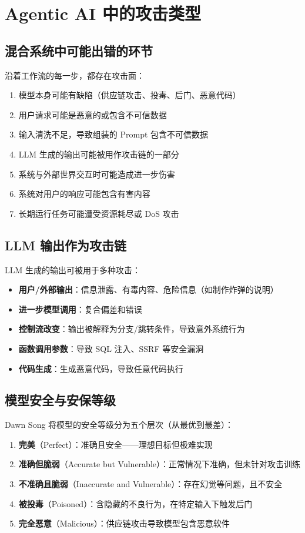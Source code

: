 \section{Agentic AI 中的攻击类型}

\subsection{混合系统中可能出错的环节}

沿着工作流的每一步，都存在攻击面：
\begin{enumerate}
    \item 模型本身可能有缺陷（供应链攻击、投毒、后门、恶意代码）
    \item 用户请求可能是恶意的或包含不可信数据
    \item 输入清洗不足，导致组装的 Prompt 包含不可信数据
    \item LLM 生成的输出可能被用作攻击链的一部分
    \item 系统与外部世界交互时可能造成进一步伤害
    \item 系统对用户的响应可能包含有害内容
    \item 长期运行任务可能遭受资源耗尽或 DoS 攻击
\end{enumerate}

\subsection{LLM 输出作为攻击链}

LLM 生成的输出可被用于多种攻击：
\begin{itemize}
    \item \textbf{用户/外部输出}：信息泄露、有毒内容、危险信息（如制作炸弹的说明）
    \item \textbf{进一步模型调用}：复合偏差和错误
    \item \textbf{控制流改变}：输出被解释为分支/跳转条件，导致意外系统行为
    \item \textbf{函数调用参数}：导致 SQL 注入、SSRF 等安全漏洞
    \item \textbf{代码生成}：生成恶意代码，导致任意代码执行
\end{itemize}

\subsection{模型安全与安保等级}

Dawn Song 将模型的安全等级分为五个层次（从最优到最差）：
\begin{enumerate}
    \item \textbf{完美}（Perfect）：准确且安全——理想目标但极难实现
    \item \textbf{准确但脆弱}（Accurate but Vulnerable）：正常情况下准确，但未针对攻击训练
    \item \textbf{不准确且脆弱}（Inaccurate and Vulnerable）：存在幻觉等问题，且不安全
    \item \textbf{被投毒}（Poisoned）：含隐藏的不良行为，在特定输入下触发后门
    \item \textbf{完全恶意}（Malicious）：供应链攻击导致模型包含恶意软件
\end{enumerate}

